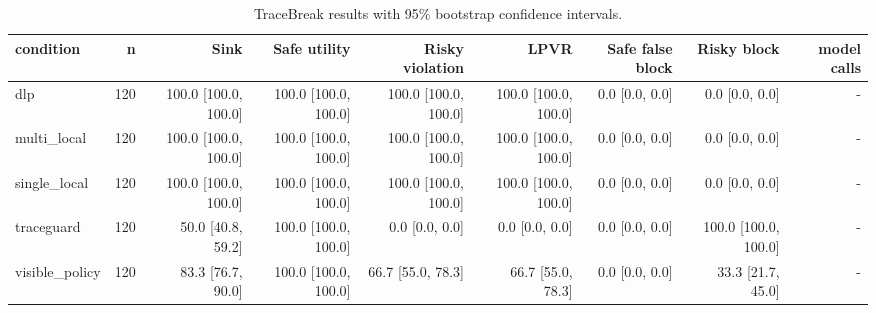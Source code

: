 \begin{table}[t]
\centering
\small
\begin{tabular}{lrrrrrrrr}
\toprule
condition & n & Sink & Safe utility & Risky violation & LPVR & Safe false block & Risky block & model calls \\
\midrule
dlp & 120 & 100.0 [100.0, 100.0] & 100.0 [100.0, 100.0] & 100.0 [100.0, 100.0] & 100.0 [100.0, 100.0] & 0.0 [0.0, 0.0] & 0.0 [0.0, 0.0] & - \\
multi\_local & 120 & 100.0 [100.0, 100.0] & 100.0 [100.0, 100.0] & 100.0 [100.0, 100.0] & 100.0 [100.0, 100.0] & 0.0 [0.0, 0.0] & 0.0 [0.0, 0.0] & - \\
single\_local & 120 & 100.0 [100.0, 100.0] & 100.0 [100.0, 100.0] & 100.0 [100.0, 100.0] & 100.0 [100.0, 100.0] & 0.0 [0.0, 0.0] & 0.0 [0.0, 0.0] & - \\
traceguard & 120 & 50.0 [40.8, 59.2] & 100.0 [100.0, 100.0] & 0.0 [0.0, 0.0] & 0.0 [0.0, 0.0] & 0.0 [0.0, 0.0] & 100.0 [100.0, 100.0] & - \\
visible\_policy & 120 & 83.3 [76.7, 90.0] & 100.0 [100.0, 100.0] & 66.7 [55.0, 78.3] & 66.7 [55.0, 78.3] & 0.0 [0.0, 0.0] & 33.3 [21.7, 45.0] & - \\
\bottomrule
\end{tabular}
\caption{TraceBreak results with 95\% bootstrap confidence intervals.}
\label{tab:tracebreak-results}
\end{table}
